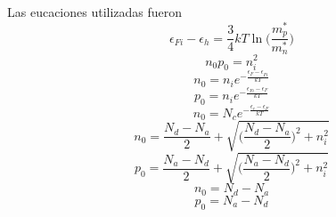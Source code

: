 \documentclass[12pt,a4paper]{article}
\begin{document}
Las eucaciones utilizadas fueron
\begin{equation}
\epsilon _{Fi} - \epsilon _{h} = \frac{3}{4} kT \ln \bigg( \frac{m_{p}^{\ast}}{m_{n}^{\ast}} \bigg)
\end{equation}
\begin{equation}
n_{0}p_{0}=n_{i}^{2}
\end{equation}
\begin{equation}
n_{0}=n_{i}e^{-\frac{\epsilon _{F} - \epsilon _{Fi}}{kT}}
\end{equation}
\begin{equation}
p_{0}=n_{i}e^{-\frac{\epsilon _{Fi} - \epsilon _{F}}{kT}}
\end{equation}
\begin{equation}
n_{0}=N_{c}e^{-\frac{\epsilon _{c} - \epsilon _{F}}{kT}}
\end{equation}
\begin{equation}
n_{0}= \frac{N_{d} - N_{a}}{2} + \sqrt{ \bigg( \frac{N_{d} - N_{a}}{2} \bigg)^{2} + n_{i}^{2}}
\end{equation}
\begin{equation}
p_{0}= \frac{N_{a} - N_{d}}{2} + \sqrt{ \bigg( \frac{N_{a} - N_{d}}{2} \bigg)^{2} + n_{i}^{2}}
\end{equation}
\begin{equation}
n_{0}= N_{d} - N_{a}
\end{equation}
\begin{equation}
p_{0}= N_{a} - N_{d}
\end{equation}
\end{document}
